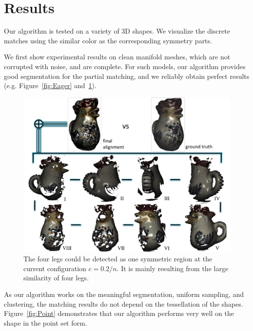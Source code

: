 \section{Results}
\label{sec:result}

Our algorithm is tested on a variety of 3D shapes. 
We visualize the discrete matches using the similar color as the corresponding symmetry parts.

We first show experimental results on clean manifold meshes, which are not corrupted with noise, and are complete. 
For such models, our algorithm provides good segmentation for the partial matching, and we reliably obtain perfect results (e.g. Figure~\ref{fig:Eager} and~\ref{fig:Tiger}). 

\begin{figure}[t]
\centering
  \includegraphics[width=0.99\linewidth]{figures/Rooster.pdf}
  \caption{The four legs could be detected as one symmetric region at the current configuration $c=0.2/n$.
  It is mainly resulting from the large similarity of four legs.}
\label{fig:Tiger}
\end{figure}

As our algorithm works on the meaningful segmentation, uniform sampling, and clustering, the matching results do not depend on the tessellation of the shapes.
Figure~\ref{fig:Point} demonstrates that our algorithm performs very well on the shape in the point set form.

